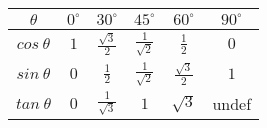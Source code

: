 \begin{table}[H]
\begin{center}
\setlength{\extrarowheight}{2.5pt}

\begin{tabular}{|c|c|c|c|c|c|}\hline
$\theta$
&
${0}^{\circ }$
&
${30}^{\circ }$
&
${45}^{\circ }$
&
${60}^{\circ }$
&
${90}^{\circ }$



\\ \hline
$cos~ \theta $
 &
$1$
&
$\frac{\sqrt{3}}{2}$
&
$\frac{1}{\sqrt{2}}$
&
$\frac{1}{2}$
&
$0$


\\ \hline
$sin~ \theta $
&
$0$
&
$\frac{1}{2} $
&
$\frac{1}{\sqrt{2}}$
&
$\frac{\sqrt{3}}{2}$
&
$1$

\\ \hline
$tan~ \theta $
&
$0$
&
$\frac{1}{\sqrt{3}}$
&
$1$ &
$\sqrt{3}$
&
undef


\\ \hline
\end{tabular}
\end{center}
\end{table}

